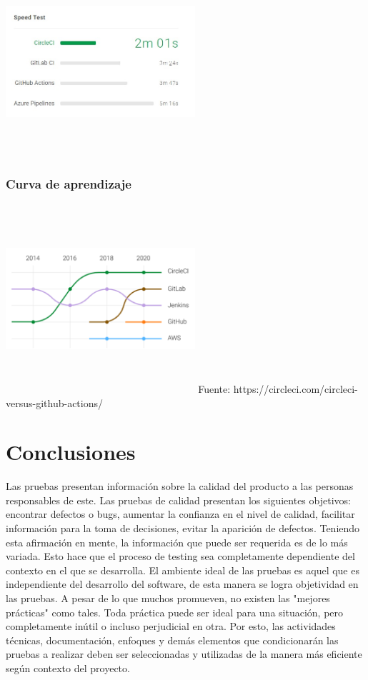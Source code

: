 \documentclass[twoside,twocolumn]{article}
\begin{document}
\includegraphics[width=7cm, height=7cm]{imagenes/comparativa.jpeg}
\subsubsection{Curva de aprendizaje}
\includegraphics[width=7cm, height=7cm]{imagenes/curva.png}
Fuente: https://circleci.com/circleci-versus-github-actions/ 
\section{Conclusiones}
Las pruebas presentan información sobre la calidad del producto a las personas responsables de este. Las pruebas de calidad presentan los siguientes objetivos: encontrar defectos o bugs, aumentar la confianza en el nivel de calidad, facilitar información para la toma de decisiones, evitar la aparición de defectos.  
Teniendo esta afirmación en mente, la información que puede ser requerida es de lo más variada. Esto hace que el proceso de testing sea completamente dependiente del contexto en el que se desarrolla.  
El ambiente ideal de las pruebas es aquel que es independiente del desarrollo del software, de esta manera se logra objetividad en las pruebas.  
A pesar de lo que muchos promueven, no existen las "mejores prácticas" como tales. Toda práctica puede ser ideal para una situación, pero completamente inútil o incluso perjudicial en otra.  
Por esto, las actividades técnicas, documentación, enfoques y demás elementos que condicionarán las pruebas a realizar deben ser seleccionadas y utilizadas de la manera más eficiente según contexto del proyecto. 
\end{document}
